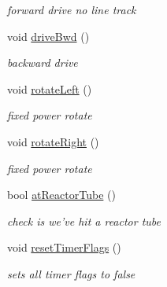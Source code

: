 \begin{DoxyCompactItemize}
\begin{DoxyCompactList}\small\item\em forward drive no line track \end{DoxyCompactList}\item 
\hypertarget{classRobot_ac8d0a3e0308350bc1fc3a2a78be2aaca}{void \hyperlink{classRobot_ac8d0a3e0308350bc1fc3a2a78be2aaca}{drive\-Bwd} ()}\label{classRobot_ac8d0a3e0308350bc1fc3a2a78be2aaca}

\begin{DoxyCompactList}\small\item\em backward drive \end{DoxyCompactList}\item 
\hypertarget{classRobot_a82a61a1f5fb4a17fd2277329bc6e8fe4}{void \hyperlink{classRobot_a82a61a1f5fb4a17fd2277329bc6e8fe4}{rotate\-Left} ()}\label{classRobot_a82a61a1f5fb4a17fd2277329bc6e8fe4}

\begin{DoxyCompactList}\small\item\em fixed power rotate \end{DoxyCompactList}\item 
\hypertarget{classRobot_a33e931c5ce2e2ce940c96203f1b6d057}{void \hyperlink{classRobot_a33e931c5ce2e2ce940c96203f1b6d057}{rotate\-Right} ()}\label{classRobot_a33e931c5ce2e2ce940c96203f1b6d057}

\begin{DoxyCompactList}\small\item\em fixed power rotate \end{DoxyCompactList}\item 
bool \hyperlink{classRobot_a9183b1dd60c7d39bf6c8ecea5690b22c}{at\-Reactor\-Tube} ()
\begin{DoxyCompactList}\small\item\em check is we've hit a reactor tube \end{DoxyCompactList}\item 
\hypertarget{classRobot_ab7c87529c987ede12b934bdfc768507e}{void \hyperlink{classRobot_ab7c87529c987ede12b934bdfc768507e}{reset\-Timer\-Flags} ()}\label{classRobot_ab7c87529c987ede12b934bdfc768507e}

\begin{DoxyCompactList}\small\item\em sets all timer flags to false \end{DoxyCompactList}\end{DoxyCompactItemize}
